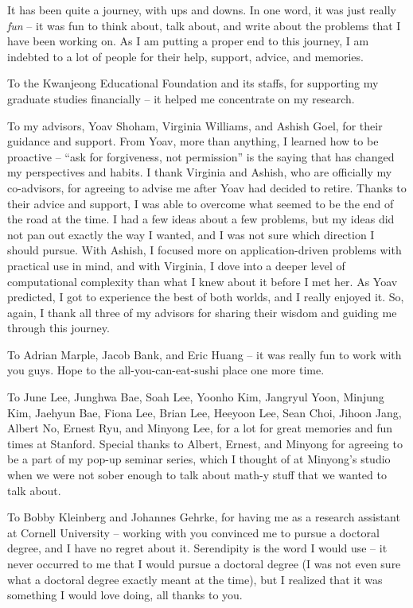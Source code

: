 It has been quite a journey, with ups and downs.
In one word, it was just really {\em fun} -- it was fun to think about, talk about, and write about the problems that I have been working on. 
As I am putting a proper end to this journey, I am indebted to a lot of people for their help, support, advice, and memories.

To the Kwanjeong Educational Foundation and its staffs, for supporting my graduate studies financially -- it helped me concentrate on my research.

To my advisors, Yoav Shoham, Virginia Williams, and Ashish Goel, for their guidance and support. From Yoav, more than anything, I learned how to be proactive -- ``ask for forgiveness, not permission'' is the saying that has changed my perspectives and habits. I thank Virginia and Ashish, who are officially my co-advisors, for agreeing to advise me after Yoav had decided to retire. Thanks to their advice and support, I was able to overcome what seemed to be the end of the road at the time. I had a few ideas about a few problems, but my ideas did not pan out exactly the way I wanted, and I was not sure which direction I should pursue. With Ashish, I focused more on application-driven problems with practical use in mind, and with Virginia, I dove into a deeper level of computational complexity than what I knew about it before I met her. As Yoav predicted, I got to experience the best of both worlds, and I really enjoyed it. So, again, I thank all three of my advisors for sharing their wisdom and guiding me through this journey.

To Adrian Marple, Jacob Bank, and Eric Huang -- it was really fun to work with you guys. Hope to the all-you-can-eat-sushi place one more time.

To June Lee, Junghwa Bae, Soah Lee, Yoonho Kim, Jangryul Yoon, Minjung Kim, Jaehyun Bae, Fiona Lee, Brian Lee, Heeyoon Lee, Sean Choi, Jihoon Jang, Albert No, Ernest Ryu, and Minyong Lee, for a lot for great memories and fun times at Stanford. Special thanks to Albert, Ernest, and Minyong for agreeing to be a part of my pop-up seminar series, which I thought of at Minyong's studio when we were not sober enough to talk about math-y stuff that we wanted to talk about. 

To Bobby Kleinberg and Johannes Gehrke, for having me as a research assistant at Cornell University -- working with you convinced me to pursue a doctoral degree, and I have no regret about it. Serendipity is the word I would use -- it never occurred to me that I would pursue a doctoral degree (I was not even sure what a doctoral degree exactly meant at the time), but I realized that it was something I would love doing, all thanks to you. 

